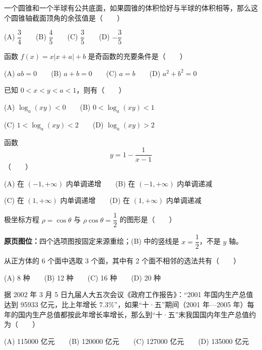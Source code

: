 \begin{question}
一个圆锥和一个半球有公共底面，如果圆锥的体积恰好与半球的体积相等，那么这个圆锥轴截面顶角的余弦值是\mbox{（　　）}

(A) $\dfrac34$　　(B) $\dfrac45$　　(C) $\dfrac35$　　(D) $-\dfrac35$

\end{question}
\begin{question}
函数 $f(x)=x|x+a|+b$ 是奇函数的充要条件是\mbox{（　　）}

(A) $ab=0$　　(B) $a+b=0$　　(C) $a=b$　　(D) $a^2+b^2=0$

\end{question}
\begin{question}
已知 $0<x<y<a<1$，则有\mbox{（　　）}

(A) $\log_a(xy)<0$　　(B) $0<\log_a(xy)<1$

(C) $1<\log_a(xy)<2$　　(D) $\log_a(xy)>2$

\end{question}
\begin{question}
函数
\nopagebreak[4]
\[
y=1-\frac{1}{x-1}
\]
\mbox{（　　）}

(A) 在 $(-1,+\infty)$ 内单调递增　　(B) 在 $(-1,+\infty)$ 内单调递减

(C) 在 $(1,+\infty)$ 内单调递增　　(D) 在 $(1,+\infty)$ 内单调递减

\Needspace{0.4\textheight}
\end{question}
\begin{question}
极坐标方程 $\rho=\cos\theta$ 与 $\rho\cos\theta=\dfrac12$ 的图形是\mbox{（　　）}

\textbf{原页图位：}四个选项图按固定来源重绘；(B) 中的竖线是 $x=\dfrac12$，不是 $y$ 轴。
\nopagebreak[4]
\begin{center}\end{center}
\nopagebreak[4]
\end{question}
\begin{question}
从正方体的 6 个面中选取 3 个面，其中有 2 个面不相邻的选法共有\mbox{（　　）}

(A) 8 种　　(B) 12 种　　(C) 16 种　　(D) 20 种

\end{question}
\begin{question}
据 2002 年 3 月 5 日九届人大五次会议《政府工作报告》：“2001 年国内生产总值达到 95933 亿元，比上年增长 7.3\%”，如果“十·五”期间（2001 年—2005 年）每年的国内生产总值都按此年增长率增长，那么到“十·五”末我国国内年生产总值约为\mbox{（　　）}

(A) 115000 亿元　　(B) 120000 亿元　　(C) 127000 亿元　　(D) 135000 亿元

\end{question}

